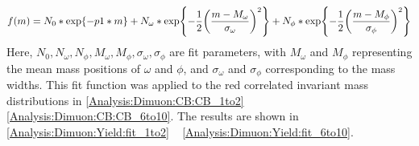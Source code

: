                 \begin{eqnarray}
                    f(m)=N_0*\exp{-p1* m}+N_{\omega}*\exp{-\frac{1}{2}\qty(\frac{m-M_{\omega}}{\sigma_{\omega}})^2}+N_{\phi}*\exp{-\frac{1}{2}\qty(\frac{m-M_{\phi}}{\sigma_{\phi}})^2}
                \end{eqnarray}
                Here, $N_0, N_{\omega}, N_{\phi}, M_{\omega}, M_{\phi}, \sigma_{\omega}, \sigma_{\phi}$ are fit parameters, with $M_{\omega}$ and $M_{\phi}$ representing the mean mass positions of $\omega$ and $\phi$, and $\sigma_{\omega}$ and $\sigma_{\phi}$ corresponding to the mass widths. This fit function was applied to the red correlated invariant mass distributions in \ref{Analysis:Dimuon:CB:CB_1to2} ~ \ref{Analysis:Dimuon:CB:CB_6to10}. The results are shown in \ref{Analysis:Dimuon:Yield:fit_1to2} ~ \ref{Analysis:Dimuon:Yield:fit_6to10}.
